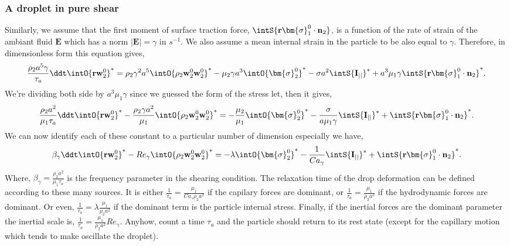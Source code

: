 \subsubsection*{A droplet in pure shear}
Similarly, we assume that the first moment of surface traction force, $\intS{ \textbf{r}\bm{\sigma}_1^0\cdot \textbf{n}_2}$, is a function of the rate of strain of the ambiant fluid $\textbf{E}$ which has a norm $|\textbf{E}| = \gamma$ in $s^{-1}$. 
We also assume a mean internal strain in the particle to be also equal to $\gamma$. 
Therefore, in dimensionless form this equation gives,
\begin{equation}
    \frac{\rho_2 a^5 \gamma}{\tau_a}
    \ddt \intO{\textbf{r} \textbf{w}^0_2}^*
    = \rho_2 \gamma^2 a^5 \intO{\rho_2  \textbf{w}_2^0 \textbf{w}_2^0}^*
    - \mu_2 \gamma a^3 \intO{\bm{\sigma}_2^0}^*
    - \sigma a^2 \intS{ \textbf{I}_{||}}^*
    + a^3 \mu_1 \gamma \intS{ \textbf{r}\bm{\sigma}_1^0\cdot \textbf{n}_2}^*. 
\end{equation}
We're dividing both side by $a^3 \mu_1 \gamma$ since we guessed the form of the stress let, then it gives, 
\begin{equation}
    \frac{\rho_2 a^2 }{\mu_1 \tau_a}
    \ddt \intO{\textbf{r} \textbf{w}^0_2}^*
    - \frac{\rho_2 \gamma a^2}{\mu_1} \intO{\rho_2  \textbf{w}_2^0 \textbf{w}_2^0}^*
    = 
    - \frac{\mu_2}{\mu_1}  \intO{\bm{\sigma}_2^0}^*
    - \frac{\sigma }{a \mu_1 \gamma} \intS{ \textbf{I}_{||}}^*
    + \intS{ \textbf{r}\bm{\sigma}_1^0\cdot \textbf{n}_2}^*. 
\end{equation}
We can now identify each of these constant to a particular number of dimension especially we have, 
\begin{equation}
    \beta_\gamma
    \ddt \intO{\textbf{r} \textbf{w}^0_2}^*
    - Re_\gamma \intO{\rho_2  \textbf{w}_2^0 \textbf{w}_2^0}^*
    = 
    - \lambda  \intO{\bm{\sigma}_2^0}^*
    - \frac{1}{Ca_\gamma} \intS{ \textbf{I}_{||}}^*
    + \intS{ \textbf{r}\bm{\sigma}_1^0\cdot \textbf{n}_2}^*. 
\end{equation}
Where, $\beta_\gamma = \frac{\rho_2 a^2 }{\mu_1 \tau_a} $ is the frequency parameter in the shearing condition.  
The relaxation time of the drop deformation can be defined according to these many sources. 
It is either $\frac{1}{\tau_a} = \frac{\mu_1}{Ca_\gamma \rho_2 a^2}$ if the capilary forces are dominant, or $\frac{1}{\tau_a} = \frac{\mu_1}{\rho_2 a^2}$ if the hydrodynamic forces are dominant. 
Or even, $\frac{1}{\tau_a} = \lambda \frac{\mu_1}{\rho_2 a^2}$ if the dominant term is the particle internal stress. 
Finally, if the inertial forces are the dominant parameter the inertial scale is, 
$\frac{1}{\tau_a} = \frac{\mu_1}{\rho_2 a^2}Re_\gamma$. 
Anyhow, count a time $\tau_a$ and the particle should return to its rest state (except for the capillary motion which tends to make oscillate the droplet). 

